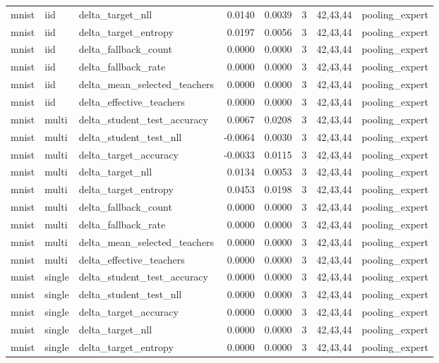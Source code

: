 \begin{tabular}{lllrrrll}
mnist & iid & delta\_target\_nll & 0.0140 & 0.0039 & 3 & 42,43,44 & pooling\_expert \\
mnist & iid & delta\_target\_entropy & 0.0197 & 0.0056 & 3 & 42,43,44 & pooling\_expert \\
mnist & iid & delta\_fallback\_count & 0.0000 & 0.0000 & 3 & 42,43,44 & pooling\_expert \\
mnist & iid & delta\_fallback\_rate & 0.0000 & 0.0000 & 3 & 42,43,44 & pooling\_expert \\
mnist & iid & delta\_mean\_selected\_teachers & 0.0000 & 0.0000 & 3 & 42,43,44 & pooling\_expert \\
mnist & iid & delta\_effective\_teachers & 0.0000 & 0.0000 & 3 & 42,43,44 & pooling\_expert \\
mnist & multi & delta\_student\_test\_accuracy & 0.0067 & 0.0208 & 3 & 42,43,44 & pooling\_expert \\
mnist & multi & delta\_student\_test\_nll & -0.0064 & 0.0030 & 3 & 42,43,44 & pooling\_expert \\
mnist & multi & delta\_target\_accuracy & -0.0033 & 0.0115 & 3 & 42,43,44 & pooling\_expert \\
mnist & multi & delta\_target\_nll & 0.0134 & 0.0053 & 3 & 42,43,44 & pooling\_expert \\
mnist & multi & delta\_target\_entropy & 0.0453 & 0.0198 & 3 & 42,43,44 & pooling\_expert \\
mnist & multi & delta\_fallback\_count & 0.0000 & 0.0000 & 3 & 42,43,44 & pooling\_expert \\
mnist & multi & delta\_fallback\_rate & 0.0000 & 0.0000 & 3 & 42,43,44 & pooling\_expert \\
mnist & multi & delta\_mean\_selected\_teachers & 0.0000 & 0.0000 & 3 & 42,43,44 & pooling\_expert \\
mnist & multi & delta\_effective\_teachers & 0.0000 & 0.0000 & 3 & 42,43,44 & pooling\_expert \\
mnist & single & delta\_student\_test\_accuracy & 0.0000 & 0.0000 & 3 & 42,43,44 & pooling\_expert \\
mnist & single & delta\_student\_test\_nll & 0.0000 & 0.0000 & 3 & 42,43,44 & pooling\_expert \\
mnist & single & delta\_target\_accuracy & 0.0000 & 0.0000 & 3 & 42,43,44 & pooling\_expert \\
mnist & single & delta\_target\_nll & 0.0000 & 0.0000 & 3 & 42,43,44 & pooling\_expert \\
mnist & single & delta\_target\_entropy & 0.0000 & 0.0000 & 3 & 42,43,44 & pooling\_expert \\

\end{tabular}
